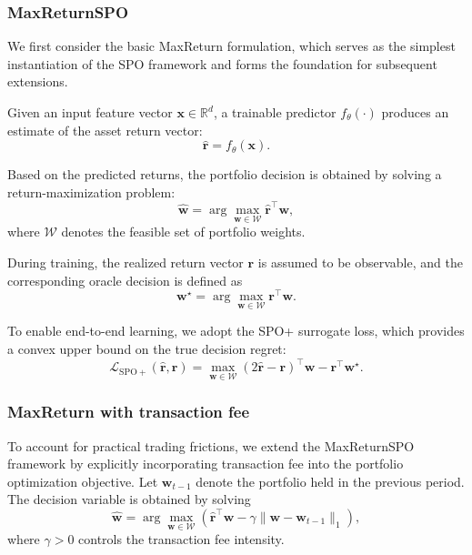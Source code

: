 \documentclass[review]{elsarticle}
\begin{document}
\subsubsection{MaxReturnSPO}

We first consider the basic MaxReturn formulation, which serves as the simplest instantiation of the SPO framework and forms the foundation for subsequent extensions.

Given an input feature vector $\bm{x} \in \mathbb{R}^d$, a trainable predictor $f_\theta(\cdot)$ produces an estimate of the asset return vector:
\begin{equation}
\hat{\bm{r}} = f_\theta(\bm{x}).
\end{equation}

Based on the predicted returns, the portfolio decision is obtained by solving a return-maximization problem:
\begin{equation}
\hat{\bm{w}} = \arg\max_{\bm{w} \in \mathcal{W}} \hat{\bm{r}}^\top \bm{w},
\end{equation}
where $\mathcal{W}$ denotes the feasible set of portfolio weights.

During training, the realized return vector $\bm{r}$ is assumed to be observable, and the corresponding oracle decision is defined as
\begin{equation}
\bm{w}^\star = \arg\max_{\bm{w} \in \mathcal{W}} \bm{r}^\top \bm{w}.
\end{equation}

To enable end-to-end learning, we adopt the SPO+ surrogate loss, which provides a convex upper bound on the true decision regret:
\begin{equation}
\mathcal{L}_{\mathrm{SPO+}}(\hat{\bm{r}}, \bm{r})
=
\max_{\bm{w} \in \mathcal{W}}
(2\hat{\bm{r}} - \bm{r})^\top \bm{w}
-
\bm{r}^\top \bm{w}^\star.
\end{equation}

\subsubsection{MaxReturn with transaction fee}
To account for practical trading frictions, we extend the MaxReturnSPO framework by explicitly incorporating transaction fee into the portfolio optimization objective. Let $\bm{w}_{t-1}$ denote the portfolio held in the previous period. The decision variable is obtained by solving
\begin{equation}
\hat{\bm{w}}
=
\arg\max_{\bm{w} \in \mathcal{W}}
\left(
\hat{\bm{r}}^\top \bm{w}
-
\gamma \lVert \bm{w} - \bm{w}_{t-1} \rVert_1
\right),
\end{equation}
where $\gamma > 0$ controls the transaction fee intensity.\\
\end{document}
